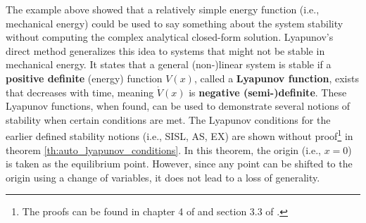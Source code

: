 The example above showed that a relatively simple energy function (i.e., mechanical energy) could be used to say something about the system stability without computing the complex analytical closed-form solution. Lyapunov's direct method generalizes this idea to systems that might not be stable in mechanical energy. It states that a general (non-)linear system is stable if a \textbf{positive definite} (energy) function $V\left(x\right)$, called a \textbf{Lyapunov function}, exists that decreases with time, meaning $\dot{V}\left(x\right)$ is \textbf{negative (semi-)definite}. These Lyapunov functions, when found, can be used to demonstrate several notions of stability when certain conditions are met. The Lyapunov conditions for the earlier defined stability notions (i.e., SISL, AS, EX) are shown without proof\footnote{The proofs can be found in chapter 4 of \cite{khalilNonlinearSystems2002} and section 3.3 of \cite{khalilNonlinearControl2015}.} in theorem \ref{th:auto_lyapunov_conditions}. In this theorem, the origin (i.e., $x = 0$) is taken as the equilibrium point. However, since any point can be shifted to the origin using a change of variables, it does not lead to a loss of generality.

